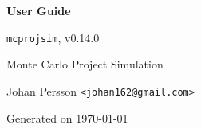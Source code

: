 \documentclass[11pt,b5paper]{report}
\begin{document}
\begin{titlepage}
  \centering
  \vspace*{2.0cm}
  {\Huge\bfseries\color{lightorange}User Guide\par}
  \vspace{1.2cm}
  {\Large \texttt{mcprojsim}, v0.14.0\par}
  \vspace{1.2cm}
  {\Large Monte Carlo Project Simulation\par}
  \vfill
  {\large Johan Persson \texttt{<johan162@gmail.com>}\par}
  {\large Generated on \today\par}
\end{titlepage}

\cleardoublepage

\tableofcontents
\cleardoublepage

\end{document}
